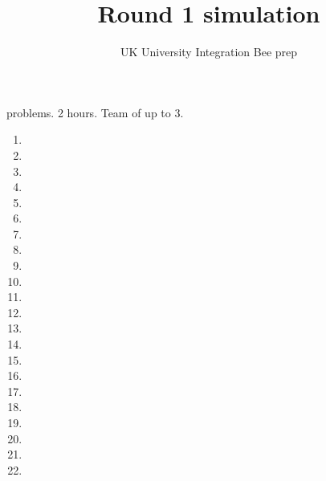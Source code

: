 
\renewcommand{\ibkind}{Round 1 sim}
\title{Round 1 simulation}
\author{UK University Integration Bee prep}
\date{}

\maketitle
{} problems. 2 hours. Team of up to 3.
\begin{enumerate}
\item \vspace{1.4cm}
\item \vspace{1.4cm}
\item \vspace{1.4cm}
\item \vspace{1.4cm}
\item \vspace{1.4cm}
\item \vspace{1.4cm}
\item \vspace{1.4cm}
\item \vspace{1.4cm}
\item \vspace{1.4cm}
\item \vspace{1.4cm}
\item \vspace{1.4cm}
\item \vspace{1.4cm}
\item \vspace{1.4cm}
\item \vspace{1.4cm}
\item \vspace{1.4cm}
\item \vspace{1.4cm}
\item \vspace{1.4cm}
\item \vspace{1.4cm}
\item \vspace{1.4cm}
\item \vspace{1.4cm}
\item \vspace{1.4cm}
\item \vspace{1.4cm}

\end{enumerate}

